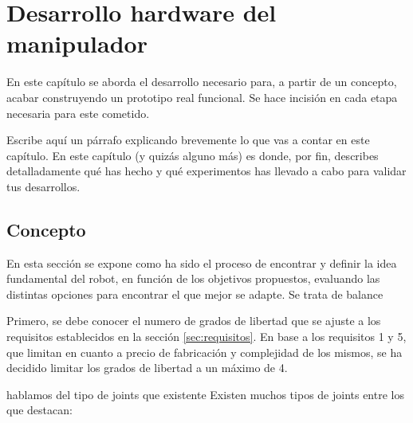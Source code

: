\chapter{Desarrollo hardware del manipulador}
\label{cap:capitulo5}

\vspace{1cm}

En este capítulo se aborda el desarrollo necesario para, a partir de un concepto, acabar construyendo un prototipo real funcional. Se 
hace incisión en cada etapa necesaria para este cometido.


Escribe aquí un párrafo explicando brevemente lo que vas a contar en este capítulo. En este capítulo (y quizás alguno más) es donde, por fin, describes detalladamente qué has hecho y qué experimentos has llevado a cabo para validar tus desarrollos.

\section{Concepto}
En esta sección se expone como ha sido el proceso de encontrar y definir la idea fundamental del robot, en función de 
los objetivos propuestos, evaluando las distintas opciones para encontrar el que mejor se adapte. Se trata de balance

Primero, se debe conocer el numero de grados de libertad que se ajuste a los requisitos establecidos en la sección \ref{sec:requisitos}. En base 
a los requisitos 1 y 5, que limitan en cuanto a precio de fabricación y complejidad de los mismos, se ha decidido limitar los grados de 
libertad a un máximo de 4. 

hablamos del tipo de joints que existente
Existen muchos tipos de joints entre los que destacan:

